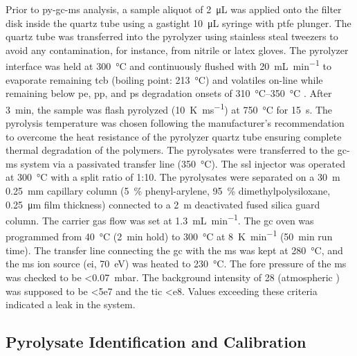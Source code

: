 Prior to \ac{py-gc-ms} analysis, a sample aliquot of \SI{2}{\micro\liter} was applied onto the filter disk inside the quartz tube using a gastight \SI{10}{\micro\liter} syringe with \ac{ptfe} plunger. The quartz tube was transferred into the pyrolyzer using stainless steal tweezers to avoid any contamination, for instance, from nitrile or latex gloves. The pyrolyzer interface was held at \SI{300}{\degreeCelsius} and continuously flushed with \SI{20}{\milli\liter\per\minute}  to evaporate remaining \ac{tcb} (boiling point: \SI{213}{\degreeCelsius}) and volatiles on-line while remaining below \ac{pe}, \ac{pp}, and \ac{ps} degradation onsets of \SIrange{310}{350}{\degreeCelsius} \citep{DavidIntroducing2019}. After \SI{3}{\minute}, the sample was flash pyrolyzed (\SI{10}{\kelvin\per\milli\second}) at \SI{750}{\degreeCelsius} for \SI{15}{\second}. The pyrolysis temperature was chosen following the manufacturer's recommendation to overcome the heat resistance of the pyrolyzer quartz tube ensuring complete thermal degradation of the polymers. The pyrolysates were transferred to the \ac{gc-ms} system via a passivated transfer line (\SI{350}{\degreeCelsius}). The \ac{ssl} injector was operated at \SI{300}{\degreeCelsius} with a split ratio of 1:10. The pyrolysates were separated on a \SI{30}{\meter}\,\texttimes\,\SI{0.25}{\milli\meter} capillary column (\SI{5}{\percent} phenyl-arylene, \SI{95}{\percent} dimethylpolysiloxane, \SI{0.25}{\micro\meter} film thickness) connected to a \SI{2}{\meter} deactivated fused silica guard column. The  carrier gas flow was set at \SI{1.3}{\milli\liter\per\minute}. The \ac{gc} oven was programmed from \SI{40}{\degreeCelsius} (\SI{2}{\minute} hold) to \SI{300}{\degreeCelsius} at \SI{8}{\kelvin\per\minute} (\SI{50}{\minute} run time). The transfer line connecting the \ac{gc} with the \ac{ms} was kept at \SI{280}{\degreeCelsius}, and the \ac{ms} ion source (\ac{ei}, \SI{70}{\electronvolt}) was heated to \SI{230}{\degreeCelsius}.
The fore pressure of the \ac{ms} was checked to be \SI{<0.07}{\milli\bar}. The background intensity of \SI{28}{\mz} (atmospheric ) was supposed to be \num{<5e7} and the \ac{tic} \num{<e8}. Values exceeding these criteria indicated a leak in the system.

\subsection{Pyrolysate Identification and Calibration}

